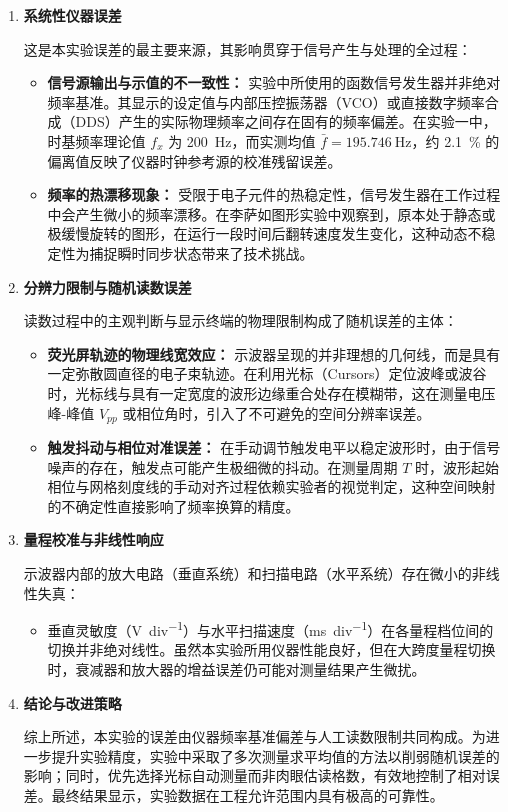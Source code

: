 \documentclass[]{../../templates/Report}%
\begin{document}
\begin{enumerate}
    \item \textbf{系统性仪器误差}

    这是本实验误差的最主要来源，其影响贯穿于信号产生与处理的全过程：
    \begin{itemize}
        \item \textbf{信号源输出与示值的不一致性：} 实验中所使用的函数信号发生器并非绝对频率基准。其显示的设定值与内部压控振荡器（VCO）或直接数字频率合成（DDS）产生的实际物理频率之间存在固有的频率偏差。在实验一中，时基频率理论值 $f_x$ 为 \SI{200}{\hertz}，而实测均值 $\bar{f} = \SI{195.746}{\hertz}$，约 \SI{2.1}{\percent} 的偏离值反映了仪器时钟参考源的校准残留误差。
        \item \textbf{频率的热漂移现象：} 受限于电子元件的热稳定性，信号发生器在工作过程中会产生微小的频率漂移。在李萨如图形实验中观察到，原本处于静态或极缓慢旋转的图形，在运行一段时间后翻转速度发生变化，这种动态不稳定性为捕捉瞬时同步状态带来了技术挑战。
    \end{itemize}

    \item \textbf{分辨力限制与随机读数误差}

    读数过程中的主观判断与显示终端的物理限制构成了随机误差的主体：
    \begin{itemize}
        \item \textbf{荧光屏轨迹的物理线宽效应：} 示波器呈现的并非理想的几何线，而是具有一定弥散圆直径的电子束轨迹。在利用光标（Cursors）定位波峰或波谷时，光标线与具有一定宽度的波形边缘重合处存在模糊带，这在测量电压峰-峰值 $V_{pp}$ 或相位角时，引入了不可避免的空间分辨率误差。
        \item \textbf{触发抖动与相位对准误差：} 在手动调节触发电平以稳定波形时，由于信号噪声的存在，触发点可能产生极细微的抖动。在测量周期 $T$ 时，波形起始相位与网格刻度线的手动对齐过程依赖实验者的视觉判定，这种空间映射的不确定性直接影响了频率换算的精度。
    \end{itemize}

    \item \textbf{量程校准与非线性响应}

    示波器内部的放大电路（垂直系统）和扫描电路（水平系统）存在微小的非线性失真：
    \begin{itemize}
        \item 垂直灵敏度（\si{\volt\per div}）与水平扫描速度（\si{\ms\per div}）在各量程档位间的切换并非绝对线性。虽然本实验所用仪器性能良好，但在大跨度量程切换时，衰减器和放大器的增益误差仍可能对测量结果产生微扰。
    \end{itemize}

    \item \textbf{结论与改进策略}

    综上所述，本实验的误差由仪器频率基准偏差与人工读数限制共同构成。为进一步提升实验精度，实验中采取了多次测量求平均值的方法以削弱随机误差的影响；同时，优先选择光标自动测量而非肉眼估读格数，有效地控制了相对误差。最终结果显示，实验数据在工程允许范围内具有极高的可靠性。

\end{enumerate}
\end{document}
